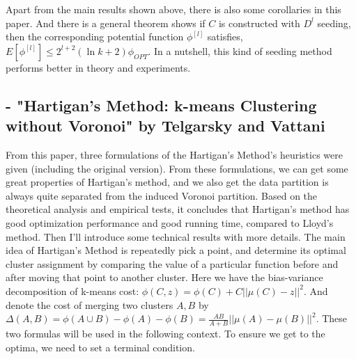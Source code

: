 \documentclass[twoside,11pt]{homework}
\begin{document}
\newline
Apart from the main results shown above, there is also some corollaries in this paper. And there is a general theorem shows if $C$ is constructed with $D^l$ seeding, then the corresponding potential function $\phi^{[l]}$ satisfies, $E[\phi^{[l]}] \leq 2^{l+2}(\ln k+2)\phi_{OPT}$.
In a nutshell, this kind of seeding method performs better in theory and experiments.





\subsection*{- "Hartigan’s Method: k-means Clustering without Voronoi" by Telgarsky and Vattani}

From this paper, three formulations of the Hartigan's Method's heuristics were given (including the original version). From these formulations, we can get some great properties of Hartigan's method, and we also get the data partition is always quite separated from the induced Voronoi partition. Based on the theoretical analysis and empirical tests, it concludes that Hartigan's method has good optimization performance and good running time, compared to Lloyd's method.\newline
Then I'll introduce some technical results with more details. The main idea of Hartigan's Method is repeatedly pick a point, and determine its optimal cluster assignment by comparing the value of a particular function before and after moving that point to another cluster. Here we have the bias-variance decomposition of k-means cost: $\phi(C,z)=\phi(C)+C||\mu (C)-z||^2$. And denote the cost of merging two clusters $A,B$ by $\Delta(A,B)=\phi(A\cup B)-\phi(A)-\phi(B)=\frac{AB}{A+B}||\mu(A)-\mu(B)||^2$. These two formulas will be used in the following context. To ensure we get to the optima, we need to set a terminal condition.
\end{document}
